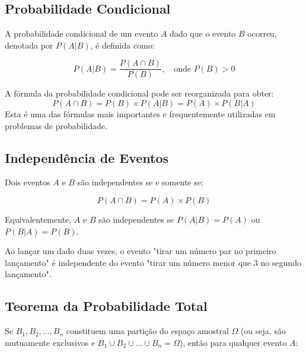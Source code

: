 \documentclass[a4paper,12pt]{article}
\begin{document}
\subsection{Probabilidade Condicional}

A probabilidade condicional de um evento $A$ dado que o evento $B$ ocorreu, denotada por $P(A|B)$, é definida como:

\begin{equation}
P(A|B) = \frac{P(A \cap B)}{P(B)}, \quad \text{onde } P(B) > 0
\end{equation}

\begin{tcolorbox}[colback=blue!5, colframe=blue!40, title=\textbf{Fórmula Fundamental}]
A fórmula da probabilidade condicional pode ser reorganizada para obter:
\begin{equation}
P(A \cap B) = P(B) \times P(A|B) = P(A) \times P(B|A)
\end{equation}
Esta é uma das fórmulas mais importantes e frequentemente utilizadas em problemas de probabilidade.
\end{tcolorbox}

\subsection{Independência de Eventos}

Dois eventos $A$ e $B$ são independentes se e somente se:

\begin{equation}
P(A \cap B) = P(A) \times P(B)
\end{equation}

Equivalentemente, $A$ e $B$ são independentes se $P(A|B) = P(A)$ ou $P(B|A) = P(B)$.

\begin{tcolorbox}[colback=gray!10, colframe=black, title=\textbf{Exemplo}]
Ao lançar um dado duas vezes, o evento "tirar um número par no primeiro lançamento" é independente do evento "tirar um número menor que 3 no segundo lançamento".
\end{tcolorbox}

\subsection{Teorema da Probabilidade Total}

Se $B_1, B_2, \ldots, B_n$ constituem uma partição do espaço amostral $\Omega$ (ou seja, são mutuamente exclusivos e $B_1 \cup B_2 \cup \ldots \cup B_n = \Omega$), então para qualquer evento $A$:
\end{document}
